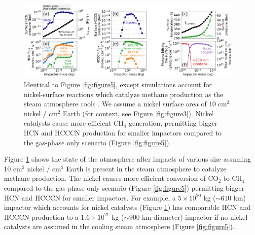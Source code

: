 \begin{figure}
  \centering
  \includegraphics[width=1.0\textwidth]{tex/5impacts/figures/Figure7.pdf}
  \caption{Identical to Figure \ref{fig:figure5}, except simulations account for nickel-surface reactions which catalyze methane production as the steam atmosphere cools \citep{Schmider_2021}. We assume a nickel surface area of 10 cm$^2$ nickel / cm$^2$ Earth (for context, see Figure \ref{fig:figure3}). Nickel catalysts cause more efficient CH$_4$ generation, permitting bigger HCN and HCCCN production for smaller impactors compared to the gas-phase only scenario (Figure \ref{fig:figure5}).}
  \label{fig:figure7}
\end{figure}

Figure \ref{fig:figure7} shows the state of the atmosphere after impacts of various size assuming 10 cm$^2$ nickel / cm$^2$ Earth is present in the steam atmosphere to catalyze methane production. The nickel causes more efficient conversion of CO$_2$ to CH$_4$ compared to the gas-phase only scenario (Figure \ref{fig:figure5}) permitting bigger HCN and HCCCN for smaller impactors. For example, a $5 \times 10^{20}$ kg ($\sim 610$ km) impactor which accounts for nickel catalysts (Figure \ref{fig:figure7}) has comparable HCN and HCCCN production to a $1.6 \times 10^{21}$ kg ($\sim 900$ km diameter) impactor if no nickel catalysts are assumed in the cooling steam atmosphere (Figure \ref{fig:figure5}).


